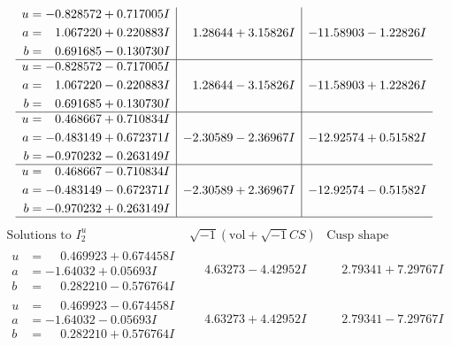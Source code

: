 \documentclass[1p]{elsarticle_modified}
\theoremstyle{definition}
\newcommand{\I}{\sqrt{-1}}
\begin{document}
$$\begin{array}{c|c|c}
\begin{aligned}
u &= -0.828572 + 0.717005 I \\
a &= \phantom{-}1.067220 + 0.220883 I \\
b &= \phantom{-}0.691685 - 0.130730 I\end{aligned}
 & \phantom{-}1.28644 + 3.15826 I & -11.58903 - 1.22826 I \\ \hline\begin{aligned}
u &= -0.828572 - 0.717005 I \\
a &= \phantom{-}1.067220 - 0.220883 I \\
b &= \phantom{-}0.691685 + 0.130730 I\end{aligned}
 & \phantom{-}1.28644 - 3.15826 I & -11.58903 + 1.22826 I \\ \hline\begin{aligned}
u &= \phantom{-}0.468667 + 0.710834 I \\
a &= -0.483149 + 0.672371 I \\
b &= -0.970232 - 0.263149 I\end{aligned}
 & -2.30589 - 2.36967 I & -12.92574 + 0.51582 I \\ \hline\begin{aligned}
u &= \phantom{-}0.468667 - 0.710834 I \\
a &= -0.483149 - 0.672371 I \\
b &= -0.970232 + 0.263149 I\end{aligned}
 & -2.30589 + 2.36967 I & -12.92574 - 0.51582 I\\
 \hline 
 \end{array}$$\newpage$$\begin{array}{c|c|c}  
\text{Solutions to }I^u_{2}& \I (\text{vol} + \sqrt{-1}CS) & \text{Cusp shape}\\
 \hline 
\begin{aligned}
u &= \phantom{-}0.469923 + 0.674458 I \\
a &= -1.64032 + 0.05693 I \\
b &= \phantom{-}0.282210 - 0.576764 I\end{aligned}
 & \phantom{-}4.63273 - 4.42952 I & \phantom{-}2.79341 + 7.29767 I \\ \hline\begin{aligned}
u &= \phantom{-}0.469923 - 0.674458 I \\
a &= -1.64032 - 0.05693 I \\
b &= \phantom{-}0.282210 + 0.576764 I\end{aligned}
 & \phantom{-}4.63273 + 4.42952 I & \phantom{-}2.79341 - 7.29767 I \\ \hline\begin{aligned}

\end{aligned}
\end{array}$$
\end{document}

